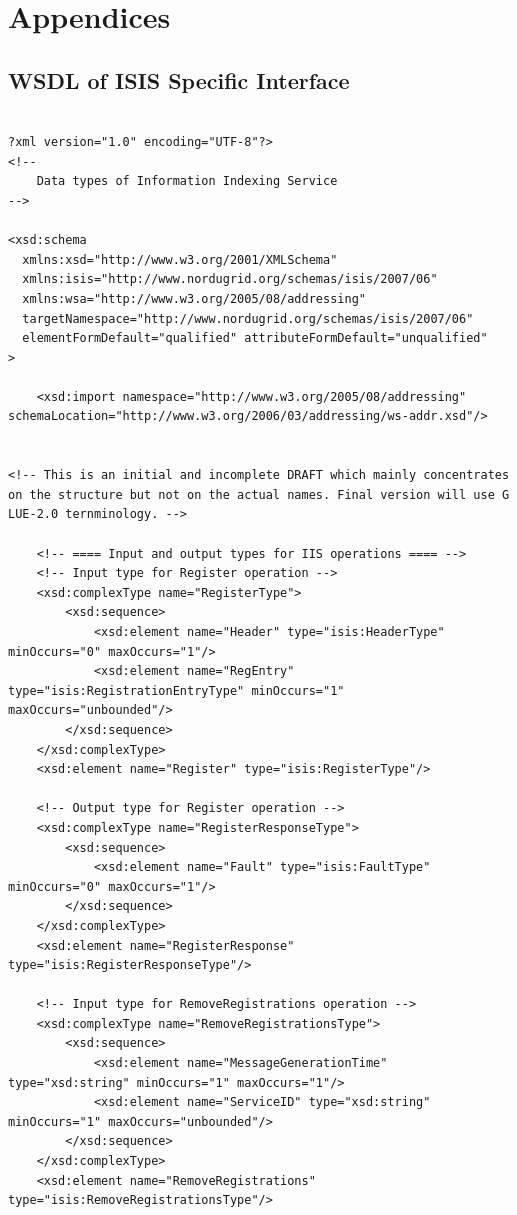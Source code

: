 \documentclass{book}
\begin{document}



\chapter{Appendices}

\section{WSDL of ISIS Specific Interface}
\label{annex:isis_wsdl}
\begin{verbatim}

?xml version="1.0" encoding="UTF-8"?>
<!--
    Data types of Information Indexing Service
-->

<xsd:schema
  xmlns:xsd="http://www.w3.org/2001/XMLSchema"
  xmlns:isis="http://www.nordugrid.org/schemas/isis/2007/06"
  xmlns:wsa="http://www.w3.org/2005/08/addressing"
  targetNamespace="http://www.nordugrid.org/schemas/isis/2007/06"
  elementFormDefault="qualified" attributeFormDefault="unqualified"
>

    <xsd:import namespace="http://www.w3.org/2005/08/addressing" schemaLocation="http://www.w3.org/2006/03/addressing/ws-addr.xsd"/>


<!-- This is an initial and incomplete DRAFT which mainly concentrates on the structure but not on the actual names. Final version will use G
LUE-2.0 ternminology. -->

    <!-- ==== Input and output types for IIS operations ==== -->
    <!-- Input type for Register operation -->
    <xsd:complexType name="RegisterType">
        <xsd:sequence>
            <xsd:element name="Header" type="isis:HeaderType" minOccurs="0" maxOccurs="1"/>
            <xsd:element name="RegEntry" type="isis:RegistrationEntryType" minOccurs="1" maxOccurs="unbounded"/>
        </xsd:sequence>
    </xsd:complexType>
    <xsd:element name="Register" type="isis:RegisterType"/>

    <!-- Output type for Register operation -->
    <xsd:complexType name="RegisterResponseType">
        <xsd:sequence>
            <xsd:element name="Fault" type="isis:FaultType" minOccurs="0" maxOccurs="1"/>
        </xsd:sequence>
    </xsd:complexType>
    <xsd:element name="RegisterResponse" type="isis:RegisterResponseType"/>

    <!-- Input type for RemoveRegistrations operation -->
    <xsd:complexType name="RemoveRegistrationsType">
        <xsd:sequence>
            <xsd:element name="MessageGenerationTime" type="xsd:string" minOccurs="1" maxOccurs="1"/>
            <xsd:element name="ServiceID" type="xsd:string" minOccurs="1" maxOccurs="unbounded"/>
        </xsd:sequence>
    </xsd:complexType>
    <xsd:element name="RemoveRegistrations" type="isis:RemoveRegistrationsType"/>


\end{verbatim}
\end{document}
